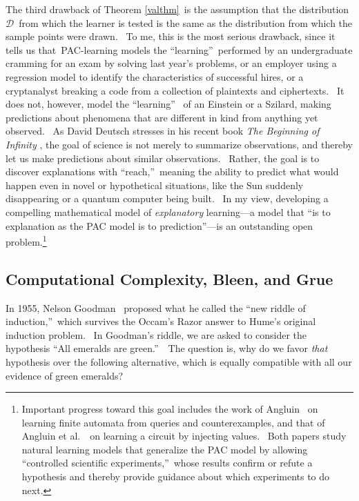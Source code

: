 \documentclass[12pt,onecolumn]{article}%
\begin{document}
The third drawback of Theorem \ref{valthm}\ is the assumption that the
distribution $\mathcal{D}$\ from which the learner is tested is the same as
the distribution from which the sample points were drawn. \ To me, this is the
most serious drawback, since it tells us that\ PAC-learning models the
\textquotedblleft learning\textquotedblright\ performed by an undergraduate
cramming for an exam by solving last year's problems, or an employer using a
regression model to identify the characteristics of successful hires, or a
cryptanalyst breaking a code from a collection of plaintexts and ciphertexts.
\ It does not, however, model the \textquotedblleft learning\textquotedblright%
\ of an Einstein or a Szilard, making predictions about phenomena that are
different in kind from anything yet observed. \ As David Deutsch stresses in
his recent book \textit{The Beginning of Infinity} \cite{deutsch:infinity},
the goal of science is not merely to summarize observations, and thereby let
us make predictions about similar observations. \ Rather, the goal is to
discover explanations with \textquotedblleft reach,\textquotedblright\ meaning
the ability to predict what would happen even in novel or hypothetical
situations, like the Sun suddenly disappearing or a quantum computer being
built. \ In my view, developing a compelling mathematical model of
\textit{explanatory} learning---a model that \textquotedblleft is to
explanation as the PAC model is to prediction\textquotedblright---is an
outstanding open problem.\footnote{Important progress toward this goal
includes the work of Angluin \cite{angluin}\ on learning finite automata from
queries and counterexamples, and that of Angluin et al.\ \cite{aacw}\ on
learning a circuit by injecting values. \ Both papers study natural learning
models that generalize the PAC model by allowing \textquotedblleft controlled
scientific experiments,\textquotedblright\ whose results confirm or refute a
hypothesis and thereby provide guidance about which experiments to do next.}

\subsection{Computational Complexity, Bleen, and Grue\label{GRUE}}

In 1955, Nelson Goodman \cite{goodman}\ proposed what he called the
\textquotedblleft new riddle of induction,\textquotedblright\ which survives
the Occam's Razor answer to Hume's original induction problem. \ In Goodman's
riddle, we are asked to consider the hypothesis \textquotedblleft All emeralds
are green.\textquotedblright\ \ The question is, why do we favor \textit{that}
hypothesis over the following alternative, which is equally compatible with
all our evidence of green emeralds?
\end{document}

